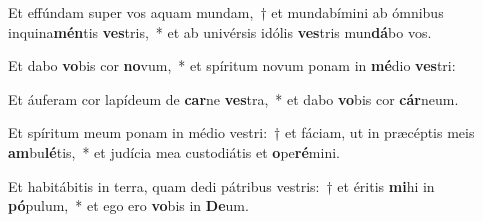 \item Et effúndam super vos aquam mundam,~† et mundabímini ab ómnibus inquina\textbf{mén}tis \textbf{ves}tris,~* et ab univérsis idólis \textbf{ves}tris mun\textbf{dá}bo vos.
\item Et dabo \textbf{vo}bis cor \textbf{no}vum,~* et spíritum novum ponam in \textbf{mé}dio \textbf{ves}tri:
\item Et áuferam cor lapídeum de \textbf{car}ne \textbf{ves}tra,~* et dabo \textbf{vo}bis cor \textbf{cár}neum.
\item Et spíritum meum ponam in médio vestri:~† et fáciam, ut in præcéptis meis \textbf{am}bu\textbf{lé}tis,~* et judícia mea custodiátis et \textbf{o}pe\textbf{ré}mini.
\item Et habitábitis in terra, quam dedi pátribus vestris:~† et éritis \textbf{mi}hi in \textbf{pó}pulum,~* et ego ero \textbf{vo}bis in \textbf{De}um.

